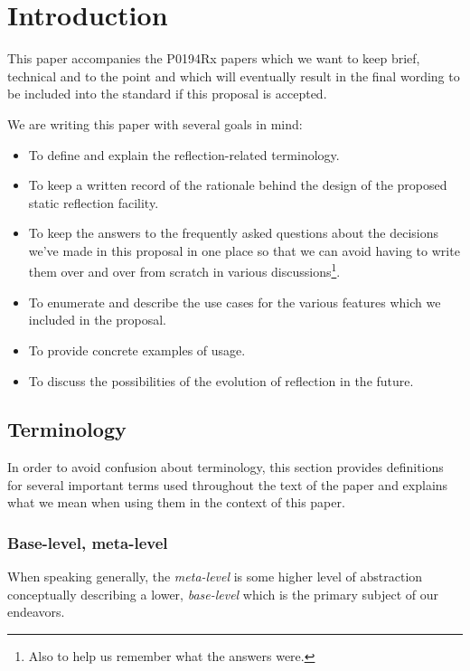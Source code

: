 \section{Introduction}

This paper accompanies the P0194Rx papers which we want to keep brief, technical
and to the point and which will eventually result in the final wording to be
included into the standard if this proposal is accepted.

We are writing this paper with several goals in mind:

\begin{itemize}
\item To define and explain the reflection-related terminology.
\item To keep a written record of the rationale behind the design of the
proposed static reflection facility.
\item To keep the answers to the frequently asked questions about
the decisions we've made in this proposal in one place so that we can avoid
having to write them over and over from scratch in various discussions\footnote
{Also to help us remember what the answers were.}.
\item To enumerate and describe the use cases for the various features
which we included in the proposal.
\item To provide concrete examples of usage.
\item To discuss the possibilities of the evolution of reflection in the future.
\end{itemize}

\subsection{Terminology}

In order to avoid confusion about terminology, this section provides definitions
for several important terms used throughout the text of the paper and
explains what we mean when using them in the context of this paper.

\subsubsection{Base-level, meta-level}
\label{term-base-meta-level}

When speaking generally, the {\em meta-level} is some higher level of abstraction
conceptually describing a lower, {\em base-level} which is the primary subject
of our endeavors.

